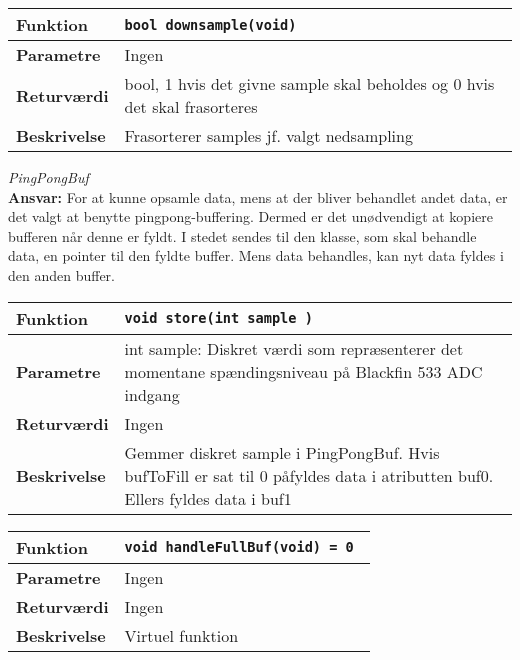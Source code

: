 \begin{center}
    \begin{tabular}{ | l | p{} |}
    \hline
    \textbf{Funktion}	& \verb+bool downsample(void) +						\\ \hline
    \textbf{Parametre} 	& Ingen		\\ \hline
    \textbf{Returværdi}	&  bool, 1 hvis det givne sample skal beholdes og 0 hvis det skal frasorteres 								\\ \hline
    \textbf{Beskrivelse}& Frasorterer samples jf. valgt nedsampling		\\ \hline
    \end{tabular}
\end{center}


\textit{PingPongBuf} \\
\textbf{Ansvar:} For at kunne opsamle data, mens at der bliver behandlet andet data, er det valgt at benytte pingpong-buffering. Dermed er det unødvendigt at kopiere bufferen når denne er fyldt. I stedet sendes til den klasse, som skal behandle data, en pointer til den fyldte buffer. Mens data behandles, kan nyt data fyldes i den anden buffer.

\begin{center}
    \begin{tabular}{ | l | p{} |}
    \hline
    \textbf{Funktion}	& \verb+void store(int sample ) +						\\ \hline
    \textbf{Parametre} 	& int sample: Diskret værdi som repræsenterer det momentane spændingsniveau på Blackfin 533 ADC indgang		\\ \hline
    \textbf{Returværdi}	& Ingen 								\\ \hline
    \textbf{Beskrivelse}& Gemmer diskret sample i PingPongBuf. Hvis bufToFill er sat til 0 påfyldes data i atributten buf0. Ellers fyldes data i buf1		\\ \hline
    \end{tabular}
\end{center} 

\begin{center}
    \begin{tabular}{ | l | p{} |}
    \hline
    \textbf{Funktion}	& \verb+void handleFullBuf(void) = 0 +						\\ \hline
    \textbf{Parametre} 	& Ingen		\\ \hline
    \textbf{Returværdi}	& Ingen 								\\ \hline
    \textbf{Beskrivelse}& Virtuel funktion		\\ \hline
    \end{tabular}
\end{center} 



